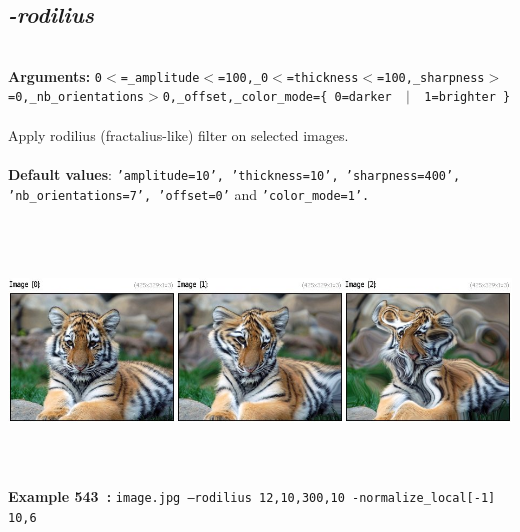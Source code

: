 \documentclass[a4paper,11pt,twoside]{book}
\begin{document}
\subsection{\emph{-rodilius} }\vspace*{-0.5em}
~\\\textbf{Arguments: } 
{\small \texttt{0$<$=\_amplitude$<$=100,\_0$<$=thickness$<$=100,\_sharpness$>$=0,\_nb\_orientations$>$0,\_offset,\_color\_mode=\{ 0=darker ~$|$~ 1=brighter \}}}\\~\\
Apply rodilius (fractalius-like) filter on selected images.
~\\~\\\textbf{Default values}: {\small \texttt{'amplitude=10', 'thickness=10', 'sharpness=400', 'nb\_orientations=7', 'offset=0'} and \texttt{'color\_mode=1'.}}
\begin{center}\includegraphics[keepaspectratio=true,height=7cm,width=\textwidth]{img/gmic_def543.jpg}\\
{\footnotesize \textbf{Example 543~:} \texttt{image.jpg --rodilius 12,10,300,10 -normalize\_local[-1] 10,6}}
\end{center}
\end{document}
